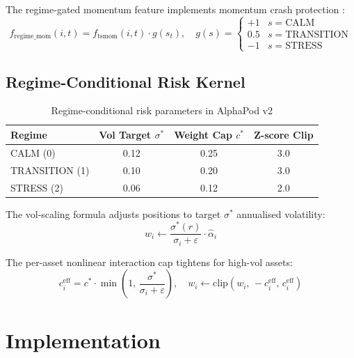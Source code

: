 \documentclass[12pt,a4paper]{article}
\begin{document}
The regime-gated momentum feature implements momentum crash protection
\citep{barroso2015}:
\begin{equation}
    f_{\text{regime\_mom}}(i,t) = f_{\text{tsmom}}(i,t) \cdot g(s_t), \quad
    g(s) = \begin{cases} +1 & s=\text{CALM} \\ 0.5 & s=\text{TRANSITION} \\ -1 & s=\text{STRESS} \end{cases}
\end{equation}

\subsection{Regime-Conditional Risk Kernel}

\begin{table}[h]
\centering
\caption{Regime-conditional risk parameters in AlphaPod v2}
\label{tab:regimes}
\begin{tabular}{lccc}
\toprule
\textbf{Regime} & \textbf{Vol Target $\sigma^*$} & \textbf{Weight Cap $c^*$} & \textbf{Z-score Clip} \\
\midrule
CALM (0) & 0.12 & 0.25 & 3.0 \\
TRANSITION (1) & 0.10 & 0.20 & 3.0 \\
STRESS (2) & 0.06 & 0.12 & 2.0 \\
\bottomrule
\end{tabular}
\end{table}

The vol-scaling formula adjusts positions to target $\sigma^*$ annualised volatility:
\begin{equation}
    w_i \leftarrow \frac{\sigma^*(r)}{\sigma_i + \varepsilon} \cdot \hat{\alpha}_i
\end{equation}

The per-asset nonlinear interaction cap tightens for high-vol assets:
\begin{equation}
    c_i^{\text{eff}} = c^* \cdot \min\!\left(1,\, \frac{\sigma^*}{\sigma_i + \varepsilon}\right), \quad
    w_i \leftarrow \mathrm{clip}(w_i,\, -c_i^{\text{eff}},\, c_i^{\text{eff}})
\end{equation}

\section{Implementation}
\end{document}
